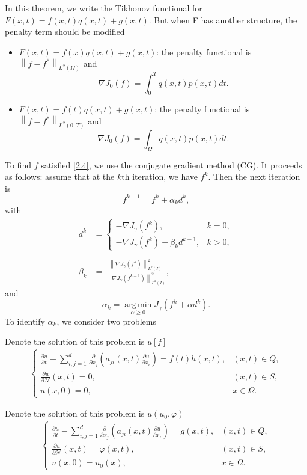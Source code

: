 \documentclass[]{article}
\begin{document}
\begin{cy}
	In this theorem, we write the Tikhonov functional for $F(x, t)=f(x, t)q(x, t)+g(x, t)$. But when F has another structure, the penalty term should be modified
	\begin{itemize}
		\item $F(x, t)=f(x)q(x, t)+g(x, t)$: the penalty functional is $\left\|f-f^*\right\|_{L^2(\Omega)}$ and $$\nabla J_0(f)=\int_0^Tq(x, t)p(x, t)dt.$$
		\item $F(x, t)=f(t)q(x, t)+g(x, t)$: the penalty functional is $\left\|f-f^*\right\|_{L^2(0, T)}$ and $$\nabla J_0(f)=\int_\Omega q(x, t)p(x, t)dt.$$
	\end{itemize}
\end{cy}
\noindent To find $f$ satisfied \eqref{2.4}, we use the conjugate gradient method (CG). It proceeds as follows: assume that at the $k$th iteration, we have $f^k$. Then the next iteration is
$$f^{k+1}=f^k+\alpha_kd^k,$$
with
\begin{align*}
	d^k&=\left\{\begin{array}{ll}
	-\nabla J_\gamma(f^k),& k=0,\\
	-\nabla J_\gamma(f^k)+\beta_kd^{k-1},& k>0,
	\end{array}\right.\\\\
	\beta_k&=\frac{\left\|\nabla J_\gamma (f^k)\right\|^2_{L^2(I)}}{\left\|\nabla J_\gamma (f^{k-1})\right\|^2_{L^2(I)}},
\end{align*}
and
$$\alpha_k=\operatorname*{arg\,min}_{\alpha\geq 0}J_\gamma(f^k+\alpha d^k).$$
To identify $\alpha_k$, we consider two problems
\begin{bt}\label{bt2.1}
	Denote the solution of this problem is $u[f]$
	\begin{align*}
		\begin{cases}
			\frac{\partial u}{\partial t}-\sum_{i, j=1}^{d}\frac{\partial}{\partial x_j}\left(a_{ji}(x, t)\frac{\partial u}{\partial x_i}\right)=f(t)h(x, t),&(x, t)\in Q,\\
			\frac{\partial u}{\partial \mathcal{N}}(x, t)=0, & (x, t)\in S,\\
			u(x, 0)=0,&x\in \Omega.
		\end{cases}
	\end{align*}
\end{bt}
\begin{bt}\label{bt2.2}
	Denote the solution of this problem is $u(u_0, \varphi)$
	\begin{align*}
		\begin{cases}
			\frac{\partial u}{\partial t}-\sum_{i, j=1}^{d}\frac{\partial}{\partial x_j}\left(a_{ji}(x, t)\frac{\partial u}{\partial x_i}\right)=g(x, t),&(x, t)\in Q,\\
			\frac{\partial u}{\partial \mathcal{N}}(x, t)=\varphi(x, t), & (x, t)\in S,\\
			u(x, 0)=u_0(x),&x\in \Omega.
		\end{cases}
	\end{align*}
\end{bt}
\end{document}
